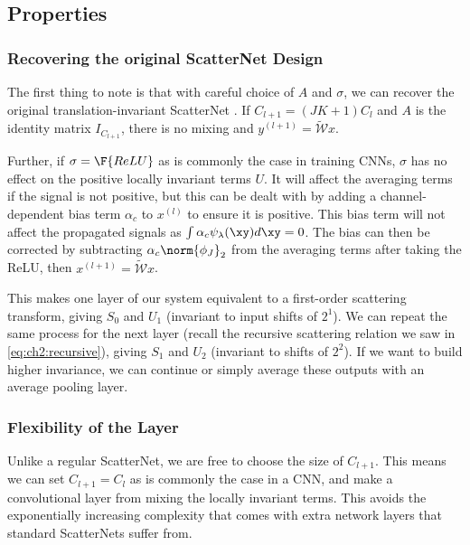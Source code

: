 \subsection{Properties}
\subsubsection{Recovering the original ScatterNet Design}
The first thing to note is that with careful choice of $A$ and $\sigma$, we can
recover the original translation-invariant ScatterNet
\cite{bruna_invariant_2013, oyallon_scaling_2017}. If $C_{l+1} = (JK+1)C_l$ 
and $A$ is the identity matrix $I_{C_{l+1}}$, there is no mixing and $y^{(l+1)} = \widetilde{\mathcal{W}}x$.

Further, if $\sigma = \F{ReLU}$ as is commonly the case in training CNNs,
$\sigma$ has no effect on the positive locally invariant terms $U$. It will affect the averaging terms
if the signal is not positive, but this can be dealt with by adding a channel-dependent 
bias term $\alpha_c$ to $x^{(l)}$ to ensure it is positive. This bias term
will not affect the propagated signals as $\int \alpha_c \psi_\lambda(\xy) d\xy =
0$. The bias can then be corrected by subtracting $\alpha_c \norm{\phi_J}_2$ from
the averaging terms after taking the ReLU, then $x^{(l+1)} =
\widetilde{\mathcal{W}}x$.

This makes one layer of our system equivalent to a first-order scattering
transform, giving $S_0$ and $U_1$ (invariant to input shifts of $2^1$). We can repeat
the same process for the next layer (recall the recursive scattering relation we
saw in \eqref{eq:ch2:recursive}),
giving $S_1$ and $U_2$ (invariant to shifts of $2^2$). If we want to build
higher invariance, we can continue or simply average these outputs with an average pooling
layer.

\subsubsection{Flexibility of the Layer}
Unlike a regular ScatterNet, we are free to choose the size of $C_{l+1}$. This
means we can set $C_{l+1} = C_{l}$ as is commonly the case in a CNN, and make a
convolutional layer from mixing the locally invariant terms. This avoids the
exponentially increasing complexity that comes with extra network layers that 
standard ScatterNets suffer from.

